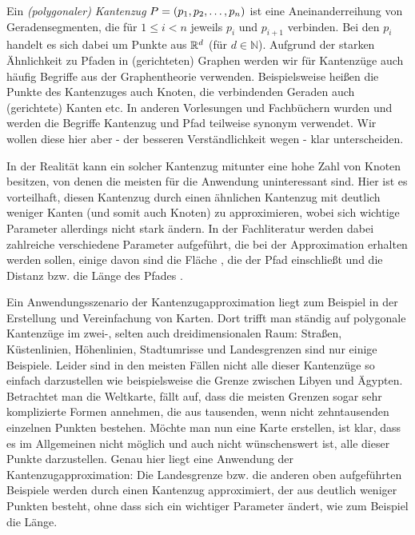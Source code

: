 	Ein \emph{(polygonaler) Kantenzug} $P = (p_1, p_2, \mathellipsis, p_n)$ ist eine Aneinanderreihung von Geradensegmenten, die für $1 \leq i < n$ jeweils $p_i$ und $p_{i+1}$ verbinden. 
	Bei den $p_i$ handelt es sich dabei um Punkte aus $\mathbb{R}^d$ (für $d \in \mathbb{N}$). Aufgrund der starken Ähnlichkeit zu Pfaden in (gerichteten) Graphen werden wir für Kantenzüge auch häufig Begriffe aus der Graphentheorie verwenden. 
	Beispielsweise heißen die Punkte des Kantenzuges auch Knoten, die verbindenden Geraden auch (gerichtete) Kanten etc.
	In anderen Vorlesungen und Fachbüchern wurden und werden die Begriffe Kantenzug und Pfad teilweise synonym verwendet.
	Wir wollen diese hier aber - der besseren Verständlichkeit wegen -  klar unterscheiden.

    In der Realität kann ein solcher Kantenzug mitunter eine hohe Zahl von Knoten besitzen, von denen die meisten für die Anwendung uninteressant sind. 
    Hier ist es vorteilhaft, diesen Kantenzug durch einen ähnlichen Kantenzug mit deutlich weniger Kanten (und somit auch Knoten) zu approximieren, wobei sich wichtige Parameter allerdings nicht stark ändern. 
    In der Fachliteratur werden dabei zahlreiche verschiedene Parameter aufgeführt, die bei der Approximation erhalten werden sollen, einige davon sind die Fläche \cite{bose}, die der Pfad einschließt und die Distanz bzw. die Länge des Pfades \cite{gudmundsson}. 
    
    Ein Anwendungsszenario der Kantenzugapproximation liegt zum Beispiel in der Erstellung und Vereinfachung von Karten. 
    Dort trifft man ständig auf polygonale Kantenzüge im \mbox{zwei-,} selten auch dreidimensionalen Raum: Straßen, Küstenlinien, Höhenlinien, Stadtumrisse und Landesgrenzen sind nur einige Beispiele. 
    Leider sind in den meisten Fällen nicht alle dieser Kantenzüge so einfach darzustellen wie beispielsweise die Grenze zwischen Libyen und Ägypten. 
    Betrachtet man die Weltkarte, fällt auf, dass die meisten Grenzen sogar sehr komplizierte Formen annehmen, die aus tausenden, wenn nicht zehntausenden einzelnen Punkten bestehen.
    Möchte man nun eine Karte erstellen, ist klar, dass es im Allgemeinen nicht möglich und auch nicht wünschenswert ist, alle dieser Punkte darzustellen. 
    Genau hier liegt eine Anwendung der Kantenzugapproximation: Die Landesgrenze bzw. die anderen oben aufgeführten Beispiele werden durch einen Kantenzug approximiert, der aus deutlich weniger Punkten besteht, ohne dass sich ein wichtiger Parameter ändert, wie zum Beispiel die Länge.
    
